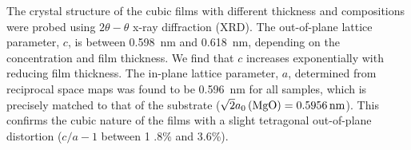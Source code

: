 \documentclass[reprint,aip,apl,floatfix,linenumbers,superscriptaddress]{revtex4-1}
\begin{document}
The crystal structure of the cubic  films with different thickness 
and compositions were probed using $2\theta-\theta$ x-ray diffraction (XRD). 
The out-of-plane lattice parameter, $c$, is between \SI{0.598}{\nano\metre} 
and \SI{0.618}{\nano\metre}, depending on the 
 concentration and film thickness. We find that  $c$ increases 
exponentially with reducing film thickness. %
The in-plane lattice parameter, $a$, determined from reciprocal space maps was 
found to be \SI{0.596}{\nano\metre} for all samples, which is precisely 
matched to that of the  substrate ($\sqrt{2} a_0\left(\ce{MgO} \right)
 = \SI{0.5956}{\nano\metre}$). This confirms the cubic nature of the  
films with a slight tetragonal out-of-plane distortion ($c/a-1$ between \num{1
.8}\% and \num{3.6}\%).



\end{document}
